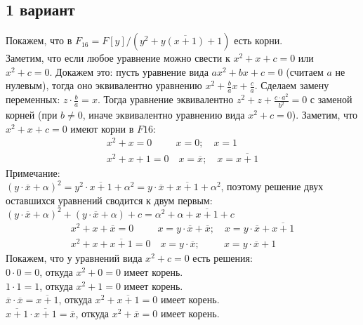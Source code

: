 	\subsection{1 вариант}
		Покажем, что в $F_{16} = F[y]/(y^2 + y\overline{(x+1)} + 1)$ есть корни.\\
		Заметим, что если любое уравнение можно свести к $x^2 + x + c = 0$ или $x^2 + c = 0$. Докажем это: пусть уравнение вида $ax^2 + bx + c = 0$ (считаем $a$ не нулевым), тогда оно эквивалентно уравнению $x^2 + \frac{b}{a}x + \frac{c}{a}$. Сделаем замену переменных: $z \cdot \frac{b}{a} = x$. Тогда уравнение эквивалентно $z^2 + z + \frac{c \cdot a^2}{b^2} = 0$ с заменой корней (при $b \ne 0$, иначе эквивалентно уравнению вида $x^2 + c = 0$). Заметим, что $x^2 + x + c = 0$ имеют корни в $F16$: \\
		\begin{gather*}
			x^2 + x = 0 \qquad \ \ x = 0; \quad x = 1 \\
			x^2 + x + 1 = 0 \quad x = \overline{x}; \quad x = \overline{x+1}
		\end{gather*}
		Примечание: \\$(y \cdot \overline{x} + \alpha)^2 = y^2 \cdot \overline{x+1} + \alpha^2 = y \cdot \overline{x} + \overline{x+1} + \alpha^2$, поэтому решение двух оставшихся уравнений сводится к двум первым: $(y \cdot \overline{x} + \alpha)^2 + (y \cdot \overline{x} + \alpha) + c = \alpha^2 + \alpha + \overline{x+1} + c$\\
		\begin{gather*}
		x^2 + x + \overline{x} = 0 \qquad \ \ x = y \cdot \overline{x} + \overline{x}; \quad x = y \cdot \overline{x} + \overline{x+1} \\
		x^2 + x + \overline{x+1} = 0 \quad x = y \cdot \overline{x}; \qquad \ \ x = y \cdot \overline{x} + 1 
		\end{gather*}
		Покажем, что у уравнений вида $x^2 + c = 0$ есть решения: \\
		$0 \cdot 0 = 0$, откуда $x^2 + 0 = 0$ имеет корень. \\
		$1 \cdot 1 = 1$, откуда $x^2 + 1 = 0$ имеет корень. \\
		$\overline{x} \cdot \overline{x} = \overline{x+1}$, откуда $x^2 + \overline{x+1} = 0$ имеет корень. \\
		$\overline{x+1} \cdot \overline{x+1} = \overline{x}$, откуда $x^2 + \overline{x} = 0$ имеет корень. 
		
